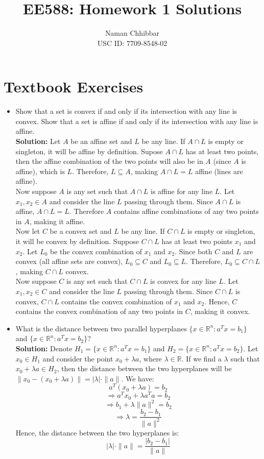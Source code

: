 \documentclass{article}
\title{EE588: Homework 1 Solutions}
\author{
  Naman Chhibbar \\
  USC ID: 7709-8548-02
}
\date{}
\begin{document}
\maketitle

\section{Textbook Exercises}
\begin{itemize}
  \item[2.2] Show that a set is convex if and only if its intersection with any line is convex. Show that a set is aﬃne if and only if its intersection with any line is aﬃne. \\

  \textbf{Solution:} Let $A$ be an affine set and $L$ be any line. If $A \cap L$ is empty or singleton, it will be affine by definition. Supose $A \cap L$ has at least two points, then the affine combination of the two points will also be in $A$ (since $A$ is affine), which is $L$. Therefore, $L \subseteq A$, making $A \cap L = L$ affine (lines are affine). \\
  Now suppose $A$ is any set such that $A \cap L$ is affine for any line $L$. Let $x_1, x_2 \in A$ and consider the line $L$ passing through them. Since $A \cap L$ is affine, $A \cap L = L$. Therefore $A$ contains affine combinations of any two points in $A$, making it affine. \\
  Now let $C$ be a convex set and $L$ be any line. If $C \cap L$ is empty or singleton, it will be convex by definition. Suppose $C \cap L$ has at least two points $x_1$ and $x_2$. Let $L_0$ be the convex combination of $x_1$ and $x_2$. Since both $C$ and $L$ are convex (all affine sets are convex), $L_0 \subseteq C$ and $L_0 \subseteq L$. Therefore, $L_0 \subseteq C \cap L$, making $C \cap L$ convex. \\
  Now suppose $C$ is any set such that $C \cap L$ is convex for any line $L$. Let $x_1, x_2 \in C$ and consider the line $L$ passing through them. Since $C \cap L$ is convex, $C \cap L$ contains the convex combination of $x_1$ and $x_2$. Hence, $C$ contains the convex combination of any two points in $C$, making it convex.

  \item[2.5] What is the distance between two parallel hyperplanes $\{x \in \mathbb{R}^n : a^T x = b_1\}$ and $\{x \in \mathbb{R}^n : a^T x = b_2\}$? \\
  
  \textbf{Solution:} Denote $H_1 = \{x \in \mathbb{R}^n : a^T x = b_1\}$ and $H_2 = \{x \in \mathbb{R}^n : a^T x = b_2\}$. Let $x_0 \in H_1$ and consider the point $x_0 + \lambda a$, where $\lambda \in \mathbb{R}$. If we find a $\lambda$ such that $x_0 + \lambda a \in H_2$, then the distance between the two hyperplanes will be $\|x_0 - (x_0 + \lambda a)\| = |\lambda| \cdot \|a\|$. We have:
  \[ a^T (x_0 + \lambda a) = b_2 \]
  \[ \Rightarrow a^T x_0 + \lambda a^T a = b_2 \]
  \[ \Rightarrow b_1 + \lambda \|a\|^2 = b_2 \]
  \[ \Rightarrow \lambda = \frac{b_2 - b_1}{\|a\|^2} \]
  Hence, the distance between the two hyperplanes is:
  \[ |\lambda| \cdot \|a\| = \frac{|b_2 - b_1|}{\|a\|} \]


\end{itemize}
\end{document}
